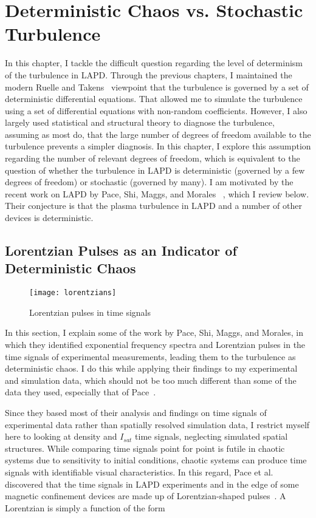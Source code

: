 \chapter{Deterministic Chaos vs. Stochastic Turbulence}
\label{c_chaos}

In this chapter, I tackle the difficult question regarding the level of determinism of the turbulence in LAPD. Through the previous chapters, I maintained the modern 
Ruelle and Takens~\cite{ruelle1971} viewpoint that the turbulence is governed by a set of deterministic differential equations. That allowed me to simulate the turbulence using a set of differential
equations with non-random coefficients. However, I also largely used statistical and structural theory to diagnose the turbulence, assuming as most do, that the large number of degrees of freedom
available to the turbulence prevents a simpler diagnosis.
In this chapter, I explore this assumption regarding the number of relevant degrees of freedom, which is equivalent to the question of whether the turbulence in LAPD is deterministic
(governed by a few degrees of freedom) or stochastic (governed by many).
I am motivated by the recent work on LAPD by Pace, Shi, Maggs, and Morales
~\cite{pace2008a,pace2008b,shi2009,maggs2011,maggs2012a,maggs2012b,maggs2013}, which I review below. Their conjecture is that the plasma turbulence in LAPD and a number of other devices is deterministic.

\section{Lorentzian Pulses as an Indicator of Deterministic Chaos}
\label{s_lorentzian_pulses}

\begin{figure}[!ht]
\centerline{\texttt{[image: lorentzians]}}
\caption{Lorentzian pulses in time signals}
\label{lorentzians}
\end{figure}


In this section, I explain some of the work by Pace, Shi, Maggs, and Morales, in which they identified exponential frequency spectra and 
Lorentzian pulses in the time signals of experimental measurements, leading them to the turbulence as deterministic chaos.
I do this while applying their findings to my experimental and simulation data, which should not be too much different than some of the data they used, especially that of Pace~\cite{pace2008a,pace2008b}.

Since they based most of their analysis and findings on time signals of experimental data rather than spatially resolved simulation data, 
I restrict myself here to looking at density and $I_{sat}$ time signals, neglecting simulated spatial structures.
While comparing time signals point for point is futile in chaotic systems due to sensitivity to initial conditions,
chaotic systems can produce time signals with identifiable visual characteristics.
In this regard, Pace et al. discovered that the time signals in LAPD experiments and in the edge of some magnetic confinement devices
are made up of Lorentzian-shaped pulses~\cite{pace2008a,pace2008b}. A Lorentzian is simply a function of the form

